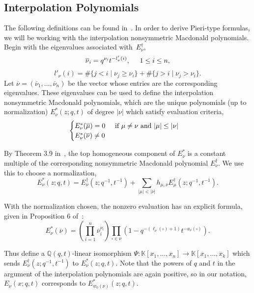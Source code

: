 \documentclass[ALCO]{cedram}
\newcommand{\K}{\mathbb{K}}
\newcommand{\EB}[1]{E_{#1}^\dagger}
\newcommand{\EBlong}[1]{E_{#1}^\dagger(z;q^{-1},t^{-1})}
\newcommand{\EIlong}[1]{E_{#1}(x;q,t)}
\newcommand{\Estar}[1]{E^*_{#1}}
\newcommand{\Estarlong}[1]{E^*_{#1}(z;q,t)}
\begin{document}
    \subsection{Interpolation Polynomials}
The following definitions can be found in~\cite{MR2525842}. In order to derive Pieri-type formulas, we will be working with the interpolation nonsymmetric Macdonald polynomials. Begin with the eigenvalues associated with~$E_\nu^\dagger$,
\begin{equation}\label{eigenvalueformula} \overline{\nu}_i = q^{\nu_i} t^{-l'_\nu(i)}, \hspace*{.5cm} 1\leq i \leq n,\end{equation}
\[ l'_\nu(i) = \# \{j<i \mid \nu_j \geq \nu_i\} + \# \{j>i \mid \nu_j > \nu_i\}.\]
Let $\overline{\nu} = (\overline{\nu}_1, \dotsc, \overline{\nu}_n)$ be the vector whose entries are the corresponding eigenvalues. These eigenvalues can be used to define the interpolation nonsymmetric Macdonald polynomials, which are the unique polynomials (up to normalization) $\Estarlong{\nu}$ of degree $| \nu |$ which satisfy evaluation criteria,
\begin{align}\label{vanishing} \begin{cases}\Estar{\nu}(\overline{\mu}) = 0  \hspace*{.5cm}\text{if } \mu \neq \nu \text{ and } |\mu| \leq |\nu|\\
\Estar{\nu}(\overline{\nu}) \neq 0
\end{cases}\end{align}

By Theorem 3.9 in~\cite{MR1456318}, the top homogeneous component of $\Estar{\nu}$ is a constant multiple of the corresponding nonsymmetric Macdonald polynomial $\EB{\nu}$. We use this to choose a normalization,
\[\Estarlong{\nu} = \EBlong{\nu} + \sum_{|\mu| < |\nu|} h_{\mu,\nu} \EBlong{\mu}.  \]

With the normalization chosen, the nonzero evaluation has an explicit formula, given in Proposition 6 of~\cite{MR2525842}:
 \begin{equation}\label{Estarformula} E^*_{\nu}(\overline{\nu}) = \left( \prod_{i=1}^n \overline{\nu}_i^{\nu_i} \right) \prod_{\square \in \nu} (1-q^{-(\ell_\nu(\square)+1)} t^{-a_\nu(\square)}).\end{equation}


Thus define a $\mathbb{Q}(q,t)$-linear isomorphism $\Psi:\K[x_1, \dotsc, x_n] \to \K[x_1, \dotsc, x_k]$ which sends $\EBlong{\nu}$ to $\Estarlong{\nu}$. Note that the powers of $q$ and $t$ in the argument of the interpolation polynomials are again positive, so in our notation, $\EIlong{\nu}$ corresponds to $\Estarlong{w_0(\nu)}$.
\end{document}
